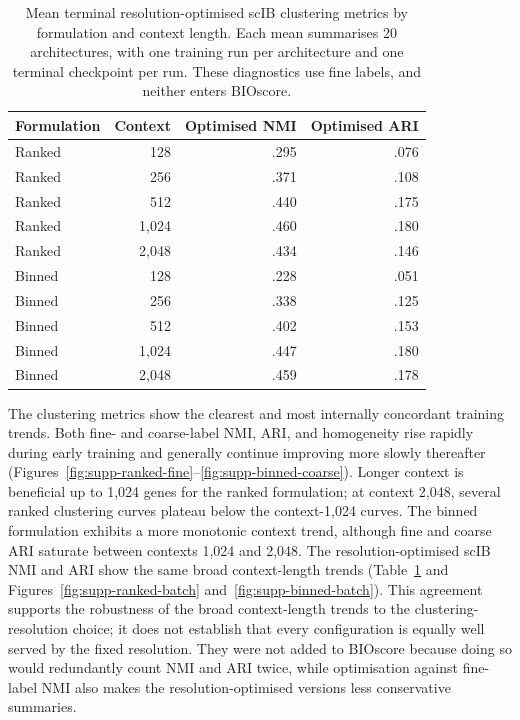 \documentclass[11pt]{article}
\begin{document}
\begin{table}[ht]
\centering
\caption{Mean terminal resolution-optimised scIB clustering metrics by formulation and context length. Each mean summarises 20 architectures, with one training run per architecture and one terminal checkpoint per run. These diagnostics use fine labels, and neither enters BIOscore.}
\label{tab:supp-terminal-scib-clustering}
\small
\begin{tabular}{lrrr}
\toprule
Formulation & Context & Optimised NMI & Optimised ARI \\
\midrule
Ranked & 128   & .295 & .076 \\
Ranked & 256   & .371 & .108 \\
Ranked & 512   & .440 & .175 \\
Ranked & 1,024 & .460 & .180 \\
Ranked & 2,048 & .434 & .146 \\
\midrule
Binned & 128   & .228 & .051 \\
Binned & 256   & .338 & .125 \\
Binned & 512   & .402 & .153 \\
Binned & 1,024 & .447 & .180 \\
Binned & 2,048 & .459 & .178 \\
\bottomrule
\end{tabular}
\end{table}

The clustering metrics show the clearest and most internally concordant training trends.
Both fine- and coarse-label NMI, ARI, and homogeneity rise rapidly during early training and generally continue improving more slowly thereafter (Figures~\ref{fig:supp-ranked-fine}--\ref{fig:supp-binned-coarse}).
Longer context is beneficial up to 1,024 genes for the ranked formulation; at context 2,048, several ranked clustering curves plateau below the context-1,024 curves.
The binned formulation exhibits a more monotonic context trend, although fine and coarse ARI saturate between contexts 1,024 and 2,048.
The resolution-optimised scIB NMI and ARI show the same broad context-length trends (Table~\ref{tab:supp-terminal-scib-clustering} and Figures~\ref{fig:supp-ranked-batch} and~\ref{fig:supp-binned-batch}).
This agreement supports the robustness of the broad context-length trends to the clustering-resolution choice; it does not establish that every configuration is equally well served by the fixed resolution.
They were not added to BIOscore because doing so would redundantly count NMI and ARI twice, while optimisation against fine-label NMI also makes the resolution-optimised versions less conservative summaries.
\end{document}
